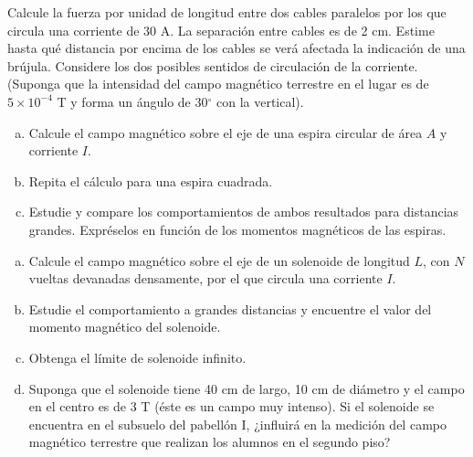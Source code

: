 \documentclass[problemas]{guia}
\begin{document}
\begin{problema}{}
    Calcule la fuerza por unidad de longitud entre dos cables paralelos por los
    que circula una corriente de 30 A. La separación entre cables es de 2 cm. 
    Estime hasta qué distancia por encima de los cables se verá afectada la 
    indicación de una brújula. Considere los dos posibles sentidos de 
    circulación de la corriente. (Suponga que la intensidad del campo magnético
    terrestre en el lugar es de $5\times10^{-4}$ T y forma un ángulo de 
    30$^\circ$ con la vertical).
\end{problema}

\begin{problema}{}
    \begin{enumerate}[(a)]
        \item Calcule el campo magnético sobre el eje de una espira circular 
            de área $A$ y corriente $I$.
        \item Repita el cálculo para una espira cuadrada.
        \item Estudie  y compare  los  comportamientos  de  ambos  resultados
            para  distancias  grandes. Expréselos en función de los momentos 
            magnéticos de las espiras.
    \end{enumerate}
\end{problema}

\begin{problema}{}
    \begin{enumerate}[(a)]
        \item Calcule el campo magnético sobre el eje de un solenoide de 
            longitud $L$, con $N$ vueltas devanadas densamente, por el que 
            circula una corriente $I$.
        \item Estudie  el  comportamiento  a  grandes  distancias  y  encuentre
            el  valor  del  momento magnético del solenoide.
        \item Obtenga el límite de solenoide infinito.
        \item Suponga que el solenoide tiene 40 cm de largo, 10 cm de diámetro 
            y el campo en el centro es de 3 T (éste es un campo muy intenso). 
            Si el solenoide se encuentra en el subsuelo del pabellón I, 
            ¿influirá en la medición del campo magnético terrestre que 
            realizan los alumnos en el segundo piso?
    \end{enumerate}
\end{problema}
\end{document}
